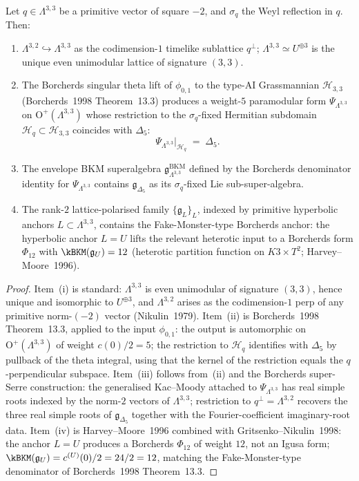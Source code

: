 \begin{theorem}
\label{thm:plat-envelope}
Let $q \in \Lambda^{3, 3}$ be a primitive vector of square $-2$, and $\sigma_q$ the Weyl reflection in $q$. Then:
\begin{enumerate}[label=\textup{(\roman*)}]
\item $\Lambda^{3, 2} \hookrightarrow \Lambda^{3, 3}$ as the codimension-$1$ timelike sublattice $q^\perp$; $\Lambda^{3, 3} \simeq U^{\oplus 3}$ is the unique even unimodular lattice of signature $(3, 3)$.
\item The Borcherds singular theta lift of $\phi_{0, 1}$ to the type-AI Grassmannian $\mathcal{H}_{3, 3}$ (Borcherds~1998 Theorem~13.3) produces a weight-$5$ paramodular form $\Psi_{\Lambda^{3, 3}}$ on $\mathrm{O}^+(\Lambda^{3, 3})$ whose restriction to the $\sigma_q$-fixed Hermitian subdomain $\mathcal{H}_q \subset \mathcal{H}_{3, 3}$ coincides with $\Delta_5$:
\[
 \Psi_{\Lambda^{3, 3}}\big|_{\mathcal{H}_q} \;=\; \Delta_5.
\]
\item The envelope BKM superalgebra $\mathfrak{g}^{\mathrm{BKM}}_{\Lambda^{3, 3}}$ defined by the Borcherds denominator identity for $\Psi_{\Lambda^{3, 3}}$ contains $\mathfrak{g}_{\Delta_5}$ as its $\sigma_q$-fixed Lie sub-super-algebra.
\item The rank-$2$ lattice-polarised family $\{\mathfrak{g}_L\}_L$, indexed by primitive hyperbolic anchors $L \subset \Lambda^{3, 3}$, contains the Fake-Monster-type Borcherds anchor: the hyperbolic anchor $L = U$ lifts the relevant heterotic input to a Borcherds form $\Phi_{12}$ with $\kBKM(\mathfrak{g}_U) = 12$ (heterotic partition function on $K3 \times T^2$; Harvey--Moore~1996).
\end{enumerate}
\end{theorem}

\begin{proof}
Item~(i) is standard: $\Lambda^{3, 3}$ is even unimodular of signature $(3, 3)$, hence unique and isomorphic to $U^{\oplus 3}$, and $\Lambda^{3, 2}$ arises as the codimension-$1$ perp of any primitive norm-$(-2)$ vector (Nikulin~1979). Item~(ii) is Borcherds~1998 Theorem~13.3, applied to the input $\phi_{0, 1}$: the output is automorphic on $\mathrm{O}^+(\Lambda^{3, 3})$ of weight $c(0)/2 = 5$; the restriction to $\mathcal{H}_q$ identifies with $\Delta_5$ by pullback of the theta integral, using that the kernel of the restriction equals the $q$-perpendicular subspace. Item~(iii) follows from~(ii) and the Borcherds super-Serre construction: the generalised Kac--Moody attached to $\Psi_{\Lambda^{3, 3}}$ has real simple roots indexed by the norm-$2$ vectors of $\Lambda^{3, 3}$; restriction to $q^\perp = \Lambda^{3, 2}$ recovers the three real simple roots of $\mathfrak{g}_{\Delta_5}$ together with the Fourier-coefficient imaginary-root data. Item~(iv) is Harvey--Moore~1996 combined with Gritsenko--Nikulin~1998: the anchor $L = U$ produces a Borcherds $\Phi_{12}$ of weight $12$, not an Igusa form; $\kBKM(\mathfrak{g}_U) = c^{(U)}(0)/2 = 24/2 = 12$, matching the Fake-Monster-type denominator of Borcherds~1998 Theorem~13.3.
\end{proof}

